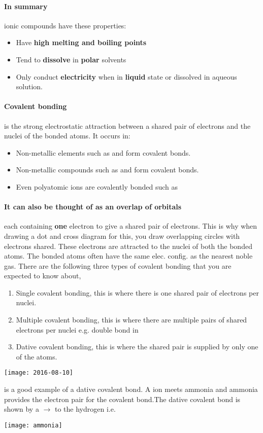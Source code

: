   \paragraph{In summary} ionic compounds have these properties:
    \begin{itemize}
		\item Have \textbf{high melting and boiling points}
		\item Tend to \textbf{dissolve} in \textbf{polar} solvents
		\item Only conduct \textbf{electricity} when in \textbf{liquid} state or dissolved in aqueous solution.
	\end{itemize}
 
    \paragraph{Covalent bonding} is the strong electrostatic attraction between a shared pair of electrons and the nuclei of the bonded atoms. It occurs in:
    \begin{itemize}
	 	\item Non-metallic elements such as  and  form covalent bonds.
	 	\item Non-metallic compounds such as  and  form covalent bonds.
	 	\item Even polyatomic ions are covalently bonded such as 
	\end{itemize}
    \paragraph{It can also be thought of as an overlap of orbitals} each containing \textbf{one} electron to give a shared pair of electrons. 
    This is why when drawing a dot and cross diagram for this, you draw overlapping circles with electrons shared.
    These electrons are attracted to the nuclei of both the bonded atoms.
    The bonded atoms often have the same elec. config. as the nearest noble gas.
    There are the following three types of covalent bonding that you are expected to know about,
	\begin{enumerate}
		\item Single covalent bonding, this is where there is one shared pair of electrons per nuclei.
		\item Multiple covalent bonding, this is where there are multiple pairs of shared electrons per nuclei e.g. double bond in  
		\item Dative covalent bonding, this is where the shared pair is supplied by only one of the atoms.
	\end{enumerate}
   \begin{center}
   \texttt{[image: 2016-08-10]}
\end{center}
    is a good example of a dative covalent bond. A  ion meets ammonia and ammonia provides the electron pair for the covalent bond.The dative covalent bond is shown by a $\rightarrow$ to the hydrogen i.e.
   \newline
    \begin{center}
\texttt{[image: ammonia]}
\end{center}
